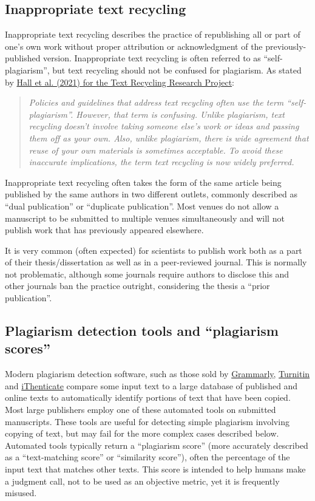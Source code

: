 \documentclass[letterpaper, 12pt]{article}
\begin{document}
\subsection*{Inappropriate text recycling}

Inappropriate text recycling describes the practice of republishing all or part of one's own work without proper attribution or acknowledgment of the previously-published version. Inappropriate text recycling is often referred to as ``self-plagiarism'', but text recycling should not be confused for plagiarism. As stated by \href{https://textrecycling.org/files/2021/06/Understanding-Text-Recycling_A-Guide-for-Researchers-V.1.pdf}{Hall et al. (2021) for the Text Recycling Research Project}:


\begin{quote}
    \textit{Policies and guidelines that address text recycling often use the term ``self-plagiarism''. However, that term is confusing. Unlike plagiarism, text recycling doesn’t involve taking someone else's work or ideas and passing them off as your own. Also, unlike plagiarism, there is wide agreement that reuse of your own materials is sometimes acceptable. To avoid these inaccurate implications, the term text recycling is now widely preferred.}
\end{quote}

Inappropriate text recycling often takes the form of the same article being published by the same authors in two different outlets, commonly described as ``dual publication'' or ``duplicate publication''. Most venues do not allow a manuscript to be submitted to multiple venues simultaneously and will not publish work that has previously appeared elsewhere.

It is very common (often expected) for scientists to publish work both as a part of their thesis/dissertation as well as in a peer-reviewed journal. This is normally not problematic, although some journals require authors to disclose this and other journals ban the practice outright, considering the thesis a ``prior publication''. 

\subsection*{Plagiarism detection tools and ``plagiarism scores''}

Modern plagiarism detection software, such as those sold by \href{https://www.grammarly.com/plagiarism-checker}{Grammarly}, \href{https://www.turnitin.com/}{Turnitin} and \href{https://www.ithenticate.com/}{iThenticate} compare some input text to a large database of published and online texts to automatically identify portions of text that have been copied. Most large publishers employ one of these automated tools on submitted manuscripts. These tools are useful for detecting simple plagiarism involving copying of text, but may fail for the more complex cases described below. Automated tools typically return a ``plagiarism score'' (more accurately described as a ``text-matching score'' or ``similarity score''), often the percentage of the input text that matches other texts. This score is intended to help humans make a judgment call, not to be used as an objective metric, yet it is frequently misused.
\end{document}
